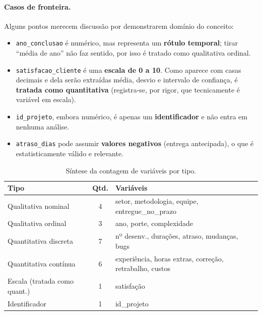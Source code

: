 \documentclass[a4paper, 12pt]{article}
\newcommand{\var}[1]{\texttt{#1}}
\begin{document}
\paragraph{Casos de fronteira.} Alguns pontos merecem discussão por
demonstrarem domínio do conceito:
\begin{itemize}[noitemsep]
	\item \var{ano\_conclusao} é numérico, mas representa um \textbf{rótulo
	      temporal}; tirar ``média de ano'' não faz sentido, por isso é tratado
	      como qualitativa ordinal.
	\item \var{satisfacao\_cliente} é uma \textbf{escala de 0 a 10}. Como aparece
	      com casas decimais e dela serão extraídas média, desvio e intervalo de
	      confiança, é \textbf{tratada como quantitativa} (registra-se, por rigor,
	      que tecnicamente é variável em escala).
	\item \var{id\_projeto}, embora numérico, é apenas um \textbf{identificador} e
	      não entra em nenhuma análise.
	\item \var{atraso\_dias} pode assumir \textbf{valores negativos} (entrega
	      antecipada), o que é estatisticamente válido e relevante.
\end{itemize}

\begin{table}[H]
\centering
\caption{Síntese da contagem de variáveis por tipo.}
\label{tab:sintese-tipos}
\begin{tabularx}{\textwidth}{@{} l c L @{}}
\toprule
\textbf{Tipo} & \textbf{Qtd.} & \textbf{Variáveis} \\
\midrule
Qualitativa nominal          & 4 & setor, metodologia, equipe, entregue\_no\_prazo \\
Qualitativa ordinal          & 3 & ano, porte, complexidade \\
Quantitativa discreta        & 7 & nº desenv., durações, atraso, mudanças, bugs \\
Quantitativa contínua        & 6 & experiência, horas extras, correção, retrabalho, custos \\
Escala (tratada como quant.) & 1 & satisfação \\
Identificador                & 1 & id\_projeto \\
\bottomrule
\end{tabularx}
\end{table}

\end{document}
